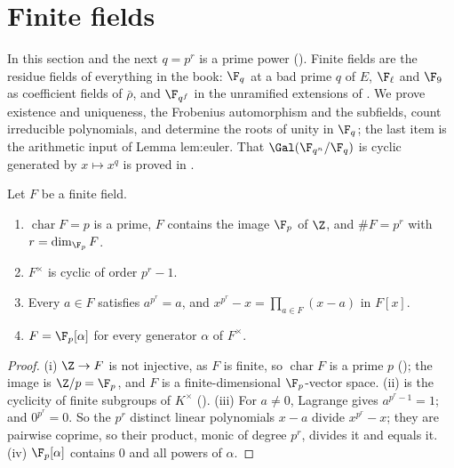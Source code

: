 \section{Finite fields}\label{sec:rings:finite-fields}

In this section and the next $q=p^r$ is a prime power (). Finite fields are the residue fields of
everything in the book: $\F_q$ at a bad prime $q$ of $E$, $\F_\ell$ and $\F_9$ as coefficient fields of $\bar\rho$, and $\F_{q^f}$ in the
unramified extensions of . We prove existence and uniqueness, the Frobenius automorphism and the subfields,
count irreducible polynomials, and determine the roots of unity in $\F_q$; the last item is the arithmetic input of Lemma
lem:euler. That $\Gal(\F_{q^n}/\F_q)$ is cyclic generated by $x\mapsto x^q$ is proved in .

\begin{proposition}\label{prop:rings:finite-field-basic}
Let $F$ be a finite field.
\begin{enumerate}[label=(\roman*)]
\item $\operatorname{char}F=p$ is a prime, $F$ contains the image $\F_p$ of $\Z$, and $\#F=p^r$ with $r=\dim_{\F_p}F$.
\item $F^\times$ is cyclic of order $p^r-1$.
\item Every $a\in F$ satisfies $a^{p^r}=a$, and $x^{p^r}-x=\prod_{a\in F}(x-a)$ in $F[x]$.
\item $F=\F_p[\alpha]$ for every generator $\alpha$ of $F^\times$.
\end{enumerate}
\end{proposition}

\begin{proof}
(i) $\Z\to F$ is not injective, as $F$ is finite, so $\operatorname{char}F$ is a prime $p$ (); the image is $\Z/p=\F_p$, and $F$ is a
finite-dimensional $\F_p$-vector space. (ii) is the cyclicity of finite subgroups of $K^\times$ (). (iii) For $a\ne0$, Lagrange
gives $a^{p^r-1}=1$; and $0^{p^r}=0$. So the $p^r$ distinct linear polynomials $x-a$ divide $x^{p^r}-x$; they are pairwise coprime, so their
product, monic of degree $p^r$, divides it and equals it. (iv) $\F_p[\alpha]$ contains $0$ and all powers of $\alpha$.
\end{proof}

